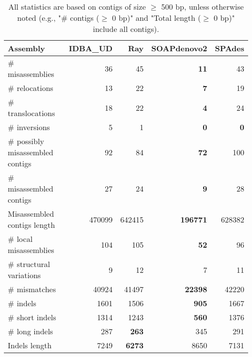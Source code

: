 \documentclass[12pt,a4paper]{article}
\begin{document}
\begin{table}[ht]
\begin{center}
\caption{All statistics are based on contigs of size $\geq$ 500 bp, unless otherwise noted (e.g., "\# contigs ($\geq$ 0 bp)" and "Total length ($\geq$ 0 bp)" include all contigs).}
\begin{tabular}{|l*{4}{|r}|}
\hline
Assembly & IDBA\_UD & Ray & SOAPdenovo2 & SPAdes \\ \hline
\# misassemblies & 36 & 45 & {\bf 11} & 43 \\ \hline
\hspace{5mm}\# relocations & 13 & 22 & {\bf 7} & 19 \\ \hline
\hspace{5mm}\# translocations & 18 & 22 & {\bf 4} & 24 \\ \hline
\hspace{5mm}\# inversions & 5 & 1 & {\bf 0} & {\bf 0} \\ \hline
\# possibly misassembled contigs & 92 & 84 & {\bf 72} & 100 \\ \hline
\# misassembled contigs & 27 & 24 & {\bf 9} & 28 \\ \hline
Misassembled contigs length & 470099 & 642415 & {\bf 196771} & 628382 \\ \hline
\# local misassemblies & 104 & 105 & {\bf 52} & 96 \\ \hline
\# structural variations & 9 & 12 & 7 & 11 \\ \hline
\# mismatches & 40924 & 41497 & {\bf 22398} & 42220 \\ \hline
\# indels & 1601 & 1506 & {\bf 905} & 1667 \\ \hline
\hspace{5mm}\# short indels & 1314 & 1243 & {\bf 560} & 1376 \\ \hline
\hspace{5mm}\# long indels & 287 & {\bf 263} & 345 & 291 \\ \hline
Indels length & 7249 & {\bf 6273} & 8650 & 7131 \\ \hline
\end{tabular}
\end{center}
\end{table}
\end{document}
